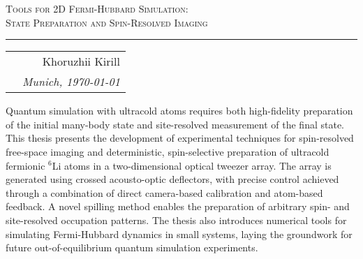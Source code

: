 

\begin{center}
    \LARGE \textsc{Tools for 2D Fermi-Hubbard Simulation: \\ State Preparation and Spin-Resolved Imaging}
\end{center}

\hrule

\phantom{42}

\begin{flushright}
    \begin{tabular}{rr}
        & Khoruzhii Kirill \\
        & \textit{Munich, \today}\\
    \end{tabular}
\end{flushright}

\noindent
Quantum simulation with ultracold atoms requires both high-fidelity preparation of the initial many-body state and site-resolved measurement of the final state. This thesis presents the development of experimental techniques for spin-resolved free-space imaging and deterministic, spin-selective preparation of ultracold fermionic $^6$Li atoms in a two-dimensional optical tweezer array. The array is generated using crossed acousto-optic deflectors, with precise control achieved through a combination of direct camera-based calibration and atom-based feedback. A novel spilling method enables the preparation of arbitrary spin- and site-resolved occupation patterns. The thesis also introduces numerical tools for simulating Fermi-Hubbard dynamics in small systems, laying the groundwork for future out-of-equilibrium quantum simulation experiments.







\thispagestyle{empty}

\newpage

\thispagestyle{empty}

\tableofcontents


